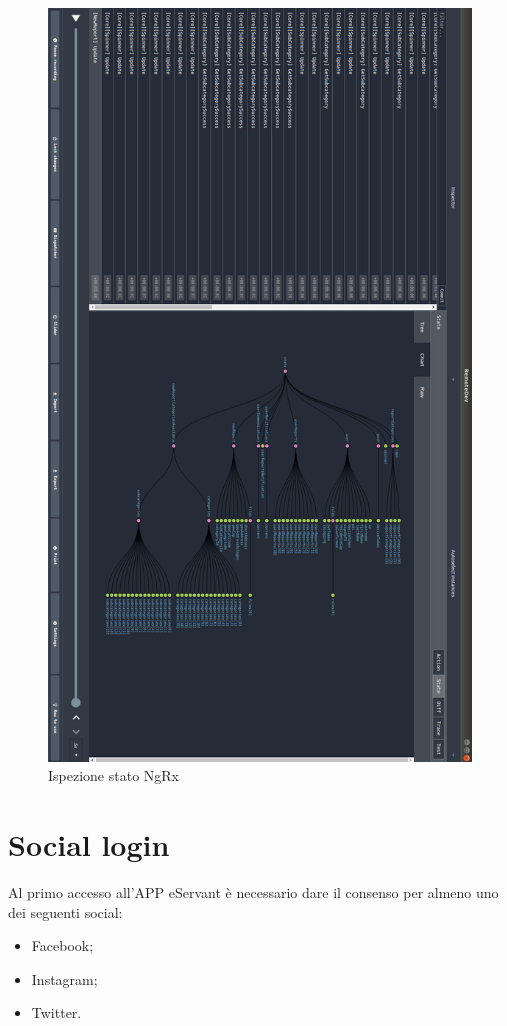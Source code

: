 \begin{figure}[h!]
    \centering  
    \caption{Ispezione stato NgRx}
    \includegraphics[scale=0.29]{img/cap2/ngrx-eservant-90}
\end{figure}

\section{Social login}
Al primo accesso all'APP eServant è necessario dare il consenso per almeno uno dei seguenti social:
\begin{itemize}
\item Facebook;
\item Instagram;
\item Twitter.
\end{itemize}

